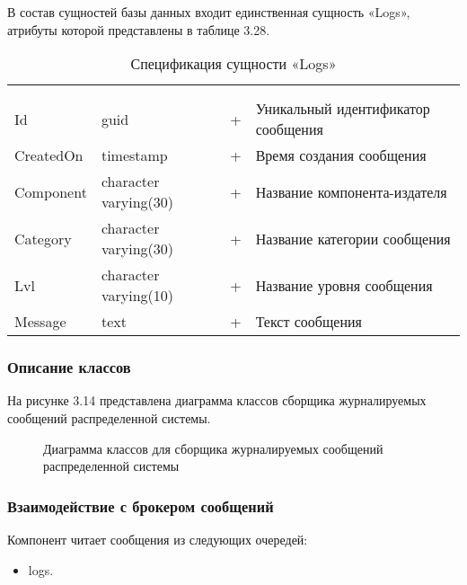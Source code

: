 В состав сущностей базы данных входит единственная сущность «Logs», атрибуты которой представлены в таблице 3.28.

\begin{xltabular}{\textwidth}{|X|X|X|X|}
	\caption{Спецификация сущности «Logs»}\label{logger_log:table}\\ \hline
	 &  &  &  \\ \hline
	 &  &  &  \\ \hline
	\endfirsthead
	 \hline
	 &  &  &  \\ \hline
	\endhead
	Id & guid & + & Уникальный идентификатор сообщения \\ \hline
	CreatedOn & timestamp & + & Время создания сообщения \\ \hline
	Component & character 
	varying(30) & + & Название компонента-издателя \\ \hline
	Category & character 
	varying(30) & + & Название категории сообщения \\ \hline
	Lvl & character 
	varying(10) & + & Название уровня сообщения \\ \hline
	Message & text & + & Текст сообщения \\ \hline
\end{xltabular}

\subsubsection{Описание классов}

На рисунке 3.14 представлена диаграмма классов сборщика журналируемых сообщений распределенной системы.

\begin{figure}[H]
\caption{Диаграмма классов для сборщика журналируемых сообщений распределенной системы}
\label{logger/diagram_classes:image}
\end{figure}

\subsubsection{Взаимодействие с брокером сообщений}

Компонент читает сообщения из следующих очередей:
\begin{itemize}
\item logs.
\end{itemize}


